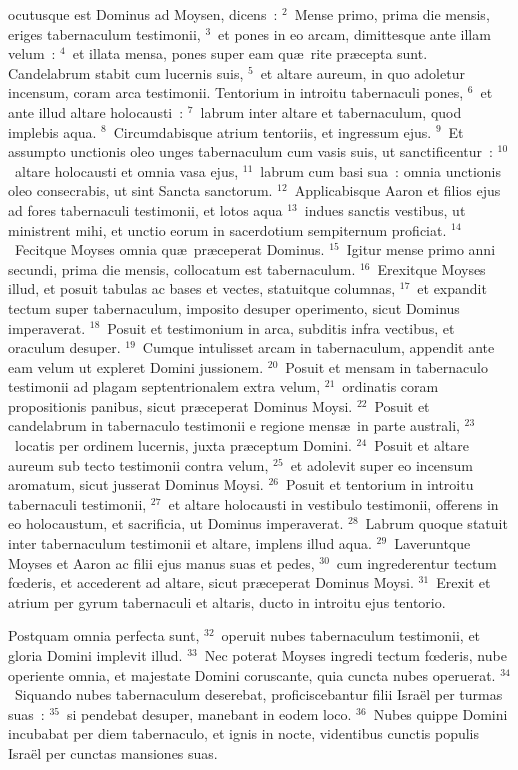 \bchapter
{}ocutusque est Dominus ad Moysen, dicens~:
${}^{2}$~Mense primo, prima die mensis, eriges tabernaculum testimonii,
${}^{3}$~et pones in eo arcam, dimittesque ante illam velum~:
${}^{4}$~et illata mensa, pones super eam qu\ae\ rite pr\ae cepta sunt. Candelabrum stabit cum lucernis suis,
${}^{5}$~et altare aureum, in quo adoletur incensum, coram arca testimonii. Tentorium in introitu tabernaculi pones,
${}^{6}$~et ante illud altare holocausti~:
${}^{7}$~labrum inter altare et tabernaculum, quod implebis aqua.
${}^{8}$~Circumdabisque atrium tentoriis, et ingressum ejus.
${}^{9}$~Et assumpto unctionis oleo unges tabernaculum cum vasis suis, ut sanctificentur~:
${}^{10}$~altare holocausti et omnia vasa ejus,
${}^{11}$~labrum cum basi sua~: omnia unctionis oleo consecrabis, ut sint Sancta sanctorum.
${}^{12}$~Applicabisque Aaron et filios ejus ad fores tabernaculi testimonii, et lotos aqua
${}^{13}$~indues sanctis vestibus, ut ministrent mihi, et unctio eorum in sacerdotium sempiternum proficiat.
${}^{14}$~Fecitque Moyses omnia qu\ae\ pr\ae ceperat Dominus.
${}^{15}$~Igitur mense primo anni secundi, prima die mensis, collocatum est tabernaculum.
${}^{16}$~Erexitque Moyses illud, et posuit tabulas ac bases et vectes, statuitque columnas,
${}^{17}$~et expandit tectum super tabernaculum, imposito desuper operimento, sicut Dominus imperaverat.
${}^{18}$~Posuit et testimonium in arca, subditis infra vectibus, et oraculum desuper.
${}^{19}$~Cumque intulisset arcam in tabernaculum, appendit ante eam velum ut expleret Domini jussionem.
${}^{20}$~Posuit et mensam in tabernaculo testimonii ad plagam septentrionalem extra velum,
${}^{21}$~ordinatis coram propositionis panibus, sicut pr\ae ceperat Dominus Moysi.
${}^{22}$~Posuit et candelabrum in tabernaculo testimonii e regione mens\ae\ in parte australi,
${}^{23}$~locatis per ordinem lucernis, juxta pr\ae ceptum Domini.
${}^{24}$~Posuit et altare aureum sub tecto testimonii contra velum,
${}^{25}$~et adolevit super eo incensum aromatum, sicut jusserat Dominus Moysi.
${}^{26}$~Posuit et tentorium in introitu tabernaculi testimonii,
${}^{27}$~et altare holocausti in vestibulo testimonii, offerens in eo holocaustum, et sacrificia, ut Dominus imperaverat.
${}^{28}$~Labrum quoque statuit inter tabernaculum testimonii et altare, implens illud aqua.
${}^{29}$~Laveruntque Moyses et Aaron ac filii ejus manus suas et pedes,
${}^{30}$~cum ingrederentur tectum fœderis, et accederent ad altare, sicut pr\ae ceperat Dominus Moysi.
${}^{31}$~Erexit et atrium per gyrum tabernaculi et altaris, ducto in introitu ejus tentorio.

 Postquam omnia perfecta sunt,
${}^{32}$~operuit nubes tabernaculum testimonii, et gloria Domini implevit illud.
${}^{33}$~Nec poterat Moyses ingredi tectum fœderis, nube operiente omnia, et majestate Domini coruscante, quia cuncta nubes operuerat.
${}^{34}$~Siquando nubes tabernaculum deserebat, proficiscebantur filii Isra\"el per turmas suas~:
${}^{35}$~si pendebat desuper, manebant in eodem loco.
${}^{36}$~Nubes quippe Domini incubabat per diem tabernaculo, et ignis in nocte, videntibus cunctis populis Isra\"el per cunctas mansiones suas.
